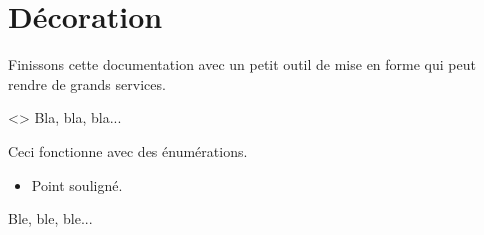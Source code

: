 \documentclass{tutodoc}
\begin{document}
\section{Décoration}

Finissons cette documentation avec un petit outil de mise en forme qui peut rendre de grands services.


\begin{tdoclatex}<>
Bla, bla, bla...

\tdocsep %

Ceci fonctionne avec des énumérations.

\begin{itemize}
    \item Point souligné.
\end{itemize}

\tdocsep %

Ble, ble, ble...
\end{tdoclatex}
\end{document}
